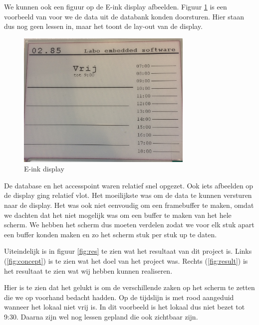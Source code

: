 \documentclass[a4paper,kul]{kulakarticle} %
\begin{document}
We kunnen ook een figuur op de E-ink display afbeelden. Figuur \ref{fig:vbscherm} is een voorbeeld van voor we de data uit de databank konden doorsturen. Hier staan dus nog geen lessen in, maar het toont de lay-out van de display.
\newline
\begin{figure}[h]
	\centering
	\includegraphics[width=0.75\textwidth]{vbScherm}
	\caption{E-ink display}
	\label{fig:vbscherm}
\end{figure}

De database en het accesspoint waren relatief snel opgezet. Ook iets afbeelden op de display ging relatief vlot. Het moeilijkste was om de data te kunnen versturen naar de display. Het was ook niet eenvoudig om een framebuffer te maken, omdat we dachten dat het niet mogelijk was om een buffer te maken van het hele scherm. We hebben het scherm dus moeten verdelen zodat we voor elk stuk apart een buffer konden maken en zo het scherm stuk per stuk up te daten.
\newline
\newline

Uiteindelijk is in figuur \ref{fig:res} te zien wat het resultaat van dit project is. Links (\ref{fig:concept}) is te zien wat het doel van het project was. Rechts (\ref{fig:result}) is het resultaat te zien wat wij hebben kunnen realiseren.

Hier is te zien dat het gelukt is om de verschillende zaken op het scherm te zetten die we op voorhand bedacht hadden. Op de tijdslijn is met rood aangeduid wanneer het lokaal niet vrij is. In dit voorbeeld is het lokaal dus niet bezet tot 9:30. Daarna zijn wel nog lessen gepland die ook zichtbaar zijn. 
\end{document}
